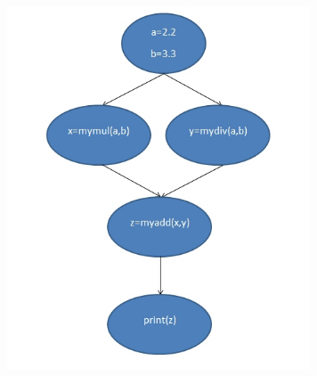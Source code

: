 \documentclass[10pt, a5paper]{article}
\begin{document}
\begin{center}
\begin{figure}[h!]
  \centering
  \includegraphics[width=9cm]{15_N_Zaitsev_fig1}
  \caption{~}
  \label{N:Zaitsev:fig1}
\end{figure}
\end{center}
\end{document}
